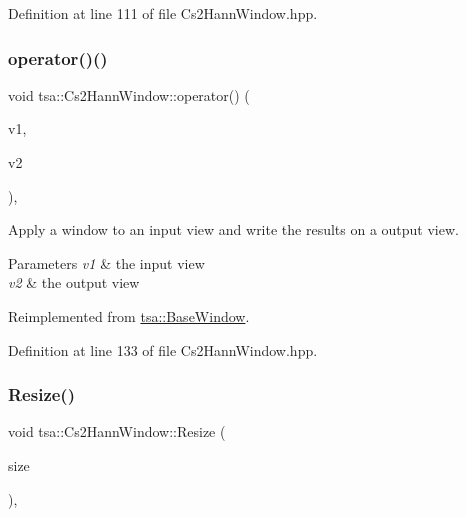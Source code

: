 Definition at line 111 of file Cs2\+Hann\+Window.\+hpp.

\mbox{\label{classtsa_1_1_cs2_hann_window_adc0b74ee1e5173f5de7f86cf714fe47f}} 
\subsubsection{\texorpdfstring{operator()()}{operator()()}\hspace{0.1cm}{\footnotesize\ttfamily [2/2]}}
{\footnotesize\ttfamily void tsa\+::\+Cs2\+Hann\+Window\+::operator() (\begin{DoxyParamCaption}\item[{\hyperlink{namespacetsa_ac599574bcc094eda25613724b8f3ca9e}{Seq\+View\+Double} \&}]{v1,  }\item[{\hyperlink{namespacetsa_ac599574bcc094eda25613724b8f3ca9e}{Seq\+View\+Double} \&}]{v2 }\end{DoxyParamCaption})\hspace{0.3cm}{\ttfamily [inline]}, {\ttfamily [virtual]}}

Apply a window to an input view and write the results on a output view.


\begin{DoxyParams}{Parameters}
{\em v1} & the input view \\
\hline
{\em v2} & the output view \\
\hline
\end{DoxyParams}


Reimplemented from \hyperlink{classtsa_1_1_base_window_afda50daa943527e09792b06e5ba69bcb}{tsa\+::\+Base\+Window}.



Definition at line 133 of file Cs2\+Hann\+Window.\+hpp.

\mbox{\label{classtsa_1_1_cs2_hann_window_a540187b8c32000d00d3023e8f8418264}} 
\subsubsection{\texorpdfstring{Resize()}{Resize()}}
{\footnotesize\ttfamily void tsa\+::\+Cs2\+Hann\+Window\+::\+Resize (\begin{DoxyParamCaption}\item[{unsigned int}]{size }\end{DoxyParamCaption})\hspace{0.3cm}{\ttfamily [inline]}, {\ttfamily [virtual]}}

